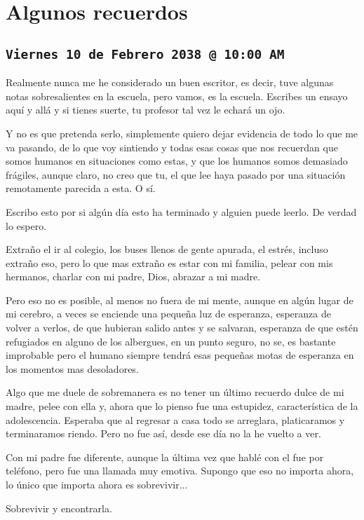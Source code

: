 \chapter{Algunos recuerdos}
\vspace*{1.5cm}
\section*{\texttt{Viernes 10 de Febrero 2038 @ 10:00 AM}}
\vspace*{1.5cm}
Realmente nunca me he considerado un buen escritor, es decir, tuve algunas notas sobresalientes en la escuela, 
pero vamos, es la escuela. Escribes un ensayo aquí y allá y si tienes suerte, tu profesor tal vez le echará un ojo.

Y no es que pretenda serlo, simplemente quiero dejar evidencia de todo lo que me va pasando, de lo que voy 
sintiendo y todas esas cosas que nos recuerdan que somos humanos en situaciones como estas, y que los humanos somos demasiado frágiles, aunque claro, 
no creo que tu, el que lee haya pasado por una situación remotamente parecida a esta. O sí.

Escribo esto por si algún día esto ha terminado y alguien puede leerlo. De verdad lo espero.

Extraño el ir al colegio, los buses llenos de gente apurada, el estrés, incluso extraño eso, pero lo que mas extraño es estar con mi familia, pelear con mis hermanos, charlar con mi padre, Dios, abrazar a mi madre.

Pero eso no es posible, al menos no fuera de mi mente, aunque en algún lugar de mi cerebro, a veces se 
enciende una pequeña luz de esperanza, esperanza de volver a verlos, de que hubieran salido antes y  se salvaran, esperanza de que estén refugiados en alguno de los albergues, en un punto seguro, no se, es bastante improbable pero el humano siempre tendrá esas pequeñas motas de esperanza en los momentos mas desoladores.

Algo que me duele de sobremanera es no tener un último recuerdo dulce de mi madre, pelee con ella y, ahora que lo pienso fue una estupidez, característica de la adolescencia. Esperaba que al regresar a casa todo se arreglara, platicaramos y terminaramos riendo. Pero no fue así, desde ese día no la he vuelto a ver.

Con mi padre fue diferente, aunque la última vez que hablé con el fue por teléfono, pero fue una llamada muy 
emotiva. Supongo que eso no importa ahora, lo único que importa ahora es sobrevivir...

Sobrevivir y encontrarla.
